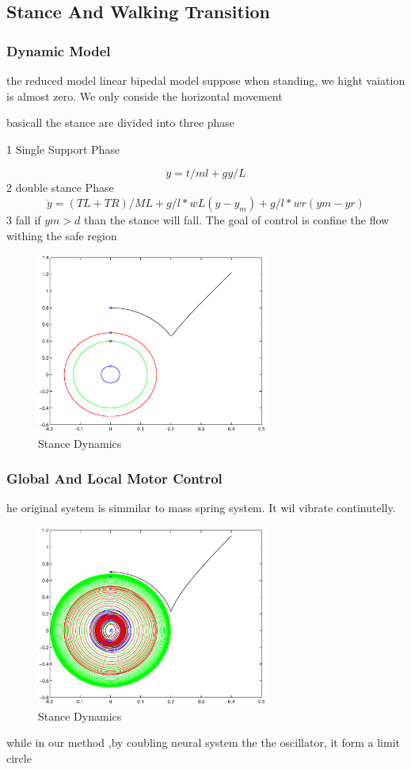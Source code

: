 \subsection{Stance And Walking Transition}
\subsubsection{Dynamic Model}
the reduced model
linear bipedal model
suppose when standing, we hight vaiation is almost zero.
We only conside the horizontal movement


basicall the stance are divided into three phase

1 Single Support Phase

\begin{equation}
\ddot{y}=t/ml+gy/L
\end{equation}
2 double stance Phase
\begin{equation}
\ddot{y}=(TL+TR)/ML+g/l*wL(y-y_m)+g/l*wr(ym-yr)
\end{equation}
3 fall 
if $ym >d$
than the stance will fall.
The goal of control is confine the flow withing the safe region
\begin{figure}[ht]
  \centering
  \includegraphics[width=3in]{images/uncontrolled.eps}
  \caption{Stance Dynamics}
\end{figure}

\subsubsection{Global And Local Motor Control}
he original system is simmilar to mass spring system.
It wil vibrate continutelly.
\begin{figure}[ht]
  \centering
  \includegraphics[width=3in]{images/AttractiveCircle.eps}
  \caption{Stance Dynamics}
\end{figure}
while in our method ,by coubling neural system the the oscillator, it form a limit circle


